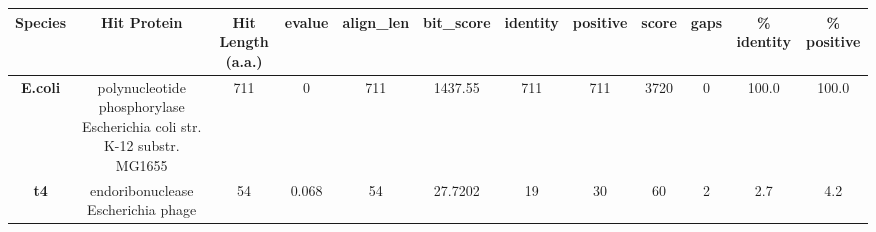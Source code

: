 \begin{tabular}{|c|c|c|c|c|c|c|c|c|c|c|c|} \hline
\textbf{Species} & \textbf{Hit Protein} & \textbf{Hit Length (a.a.)} & \textbf{evalue} & \textbf{align\_len} & \textbf{bit\_score} & \textbf{identity} & \textbf{positive} & \textbf{score} & \textbf{gaps} & \textbf{\% identity} & \textbf{\% positive} \\ \hline
\textbf{E.coli} & polynucleotide phosphorylase Escherichia coli str. K-12 substr. MG1655 & 711 & 0 & 711 & 1437.55 & 711 & 711 & 3720 & 0 & 100.0 & 100.0\\
\textbf{t4} & endoribonuclease Escherichia phage  & 54 & 0.068 & 54 & 27.7202 & 19 & 30 & 60 & 2 & 2.7 & 4.2\\
\hline \end{tabular}
